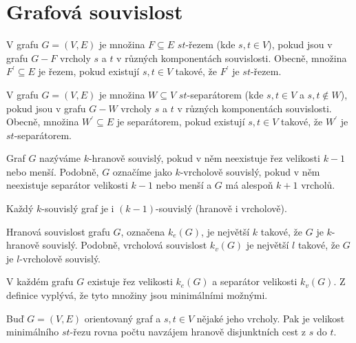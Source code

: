 \section{Grafová souvislost}
\begin{t_definition}
  V grafu $G=(V,E)$ je množina $F\subseteq E$ $st$-řezem (kde $s,t\in V$), pokud jsou v grafu $G-F$ vrcholy $s$ a $t$ v různých komponentách souvislosti. Obecně, množina $F^\prime\subseteq E$ je řezem, pokud existují $s,t\in V$ takové, že $F^\prime$ je $st$-řezem.
\end{t_definition}

\begin{t_definition}
  V grafu $G=(V,E)$ je množina $W\subseteq V$ $st$-separátorem (kde $s,t\in V$ a $s,t\notin W$), pokud jsou v grafu $G-W$ vrcholy $s$ a $t$ v různých komponentách souvislosti. Obecně, množina $W^\prime\subseteq E$ je separátorem, pokud existují $s,t\in V$ takové, že $W^\prime$ je $st$-separátorem.
\end{t_definition}

\begin{t_definition}
  Graf $G$ nazýváme $k$-hranově souvislý, pokud v něm neexistuje řez velikosti $k-1$ nebo menší. Podobně, $G$ označíme jako $k$-vrcholově souvislý, pokud v něm neexistuje separátor velikosti $k-1$ nebo menší a $G$ má alespoň $k+1$ vrcholů.
\end{t_definition}

\begin{t_remark}
  Každý $k$-souvislý graf je i $(k-1)$-souvislý (hranově i vrcholově).
\end{t_remark}

\begin{t_definition}
  Hranová souvislost grafu $G$, označena $k_e(G)$, je největší $k$ takové, že $G$ je $k$-hranově souvislý. Podobně, vrcholová souvislost $k_v(G)$ je největší $l$ takové, že $G$ je $l$-vrcholově souvislý.
\end{t_definition}

\begin{t_observation}
  V každém grafu $G$ existuje řez velikosti $k_e(G)$ a separátor velikosti $k_v(G)$. Z definice vyplývá, že tyto množiny jsou minimálními možnými.
\end{t_observation}

\begin{t_theorem}
  Buď $G=(V,E)$ orientovaný graf a $s, t\in V$ nějaké jeho vrcholy. Pak je velikost minimálního $st$-řezu rovna počtu navzájem hranově disjunktních cest z $s$ do $t$.
\end{t_theorem}

